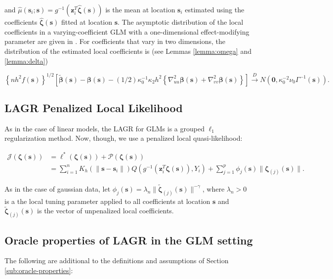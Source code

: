 \documentclass[authoryear,review, 12pt]{elsarticle}
\begin{document}
and $\hat{\mu}(\bm{s}_{i};\bm{s})=g^{-1}\left(\bm{z}_{i}^{T}\hat{\bm{\zeta}}(\bm{s})\right)$
is the mean at location $\bm{s}_{i}$ estimated using the coefficients
$\hat{\bm{\zeta}}(\bm{s})$ fitted at location $\bm{s}$. The asymptotic
distribution of the local coefficients in a varying-coefficient GLM
with a one-dimensional effect-modifying parameter are given in \citet{Cai-Fan-Li-2000}.
For coefficients that vary in two dimensions, the distribution of
the estimated local coefficients is (see Lemmas \ref{lemma:omega}
and \ref{lemma:delta})

\[
\left\{ nh^{2}f(\bm{s})\right\} ^{1/2}\left[\tilde{\bm{\beta}}(\bm{s})-\bm{\beta}(\bm{s})-(1/2)\kappa_{0}^{-1}\kappa_{2}h^{2}\left\{ \nabla_{uu}^{2}\bm{\beta}(\bm{s})+\nabla_{vv}^{2}\bm{\beta}(\bm{s})\right\} \right]\xrightarrow{{D}}N\left(\bm{0},\kappa_{0}^{-2}\nu_{0}\Gamma^{-1}(\bm{s})\right).
\]



\subsection{LAGR Penalized Local Likelihood}

As in the case of linear models, the LAGR for GLMs is a grouped $\ell_{1}$
regularization method. Now, though, we use a penalized local quasi-likelihood:

\begin{align}
\mathcal{J}\left(\bm{\zeta}(\bm{s})\right) & =\mathcal{\ell}^{*}\left(\bm{\zeta}(\bm{s})\right)+\mathcal{P}\left(\bm{\zeta}(\bm{s})\right)\label{eq:adaptive-lasso-GLLM}\\
 & =\sum_{i=1}^{n}K_{h}\left(\|\bm{s}-\bm{s}_{i}\|\right)Q\left(g^{-1}\left(\bm{z}_{i}^{T}\bm{\zeta}(\bm{s})\right),Y_{i}\right)+\sum_{j=1}^{p}\phi_{j}(\bm{s})\|\bm{\zeta}_{(j)}(\bm{s})\|.
\end{align}


As in the case of gaussian data, let $\phi_{j}(\bm{s})=\lambda_{n}\|\tilde{\bm{\zeta}}_{(j)}(\bm{s})\|^{-\gamma}$,
where $\lambda_{n}>0$ is a the local tuning parameter applied to
all coefficients at location $\bm{s}$ and $\tilde{\bm{\zeta}}_{(j)}(\bm{s})$
is the vector of unpenalized local coefficients.


\subsection{Oracle properties of LAGR in the GLM setting}

The following are additional to the definitions and assumptions of
Section \ref{sub:oracle-properties}:
\end{document}

